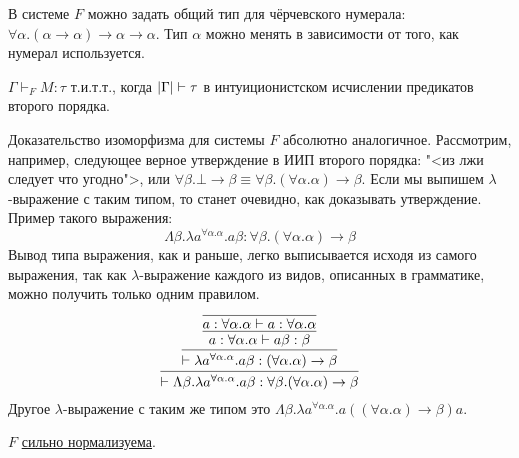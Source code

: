 В системе $F$ можно задать общий тип для чёрчевского нумерала: $\forall \alpha.(\alpha\to\alpha)\to\alpha\to\alpha$.
Тип $\alpha$ можно менять в зависимости от того, как нумерал используется.

\begin{theorem}
    $\Gamma \vdash_F M :\tau$ т.и.т.т., когда $\left|\Gamma\right| \vdash \tau$ в интуиционистском исчислении предикатов второго порядка.
\end{theorem}

Доказательство изоморфизма для системы $F$ абсолютно аналогичное.
Рассмотрим, например, следующее верное утверждение в ИИП второго порядка: "<из лжи следует что угодно">, или
$\forall \beta . \bot \to \beta \equiv \forall \beta . (\forall \alpha.\alpha) \to \beta$.
Если мы выпишем $\lambda$-выражение с таким типом, то станет очевидно, как доказывать утверждение. Пример такого выражения:
\[
    \Lambda \beta . \lambda a^{\forall \alpha.\alpha} . a \beta :
    \forall \beta . (\forall \alpha.\alpha) \to \beta
\]
Вывод типа выражения, как и раньше, легко выписывается исходя из самого выражения,
так как $\lambda$-выражение каждого из видов, описанных в грамматике, можно получить только одним правилом.
\[
    \infer{\vdash \Lambda \beta . \lambda a^{\forall \alpha.\alpha} . a \beta : \forall \beta . (\forall \alpha.\alpha) \to \beta}
    {   \infer{\vdash \lambda a^{\forall \alpha.\alpha} . a \beta : (\forall \alpha.\alpha) \to \beta}
        {   \infer{a : \forall \alpha . \alpha \vdash a \beta : \beta}
            {   \infer{a : \forall \alpha.\alpha \vdash a : \forall \alpha.\alpha}{}
            }
        }
    }
\]
Другое $\lambda$-выражение с таким же типом это
$\Lambda \beta . \lambda a^{\forall \alpha . \alpha} . a ((\forall \alpha.\alpha) \to \beta) a$.

\begin{theorem}
    $F$ \hyperref[strong-normalization]{сильно нормализуема}.
\end{theorem}
